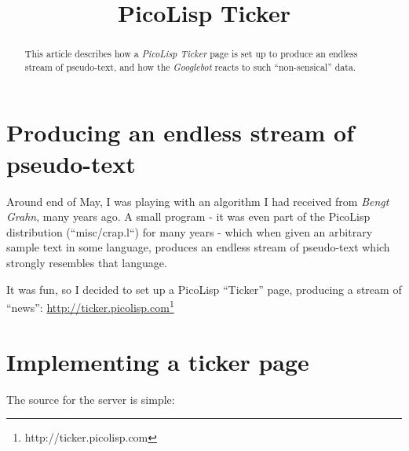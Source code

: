 \title{PicoLisp Ticker}

\maketitle





% 

\begin{abstract}
This article describes how a \emph{PicoLisp Ticker} page is set up to produce
an endless stream of pseudo-text, and how the \emph{Googlebot} reacts
to such ``non-sensical'' data.       
\end{abstract}

\section{Producing an endless stream of pseudo-text}
\label{sec:pl-ticker-producing-an-endless-stream-of-pseudo-text}

Around end of May, I was playing with an algorithm I had received from \emph{Bengt
Grahn}, many years ago. A small program - it was even part of the PicoLisp
distribution (``misc/crap.l``) for many years - which when given an arbitrary
sample text in some language, produces an endless stream of pseudo-text which
strongly resembles that language.

It was fun, so I decided to set up a PicoLisp ``Ticker'' page, producing a stream
of ``news'': \underline{http://ticker.picolisp.com}\footnote{http://ticker.picolisp.com}

\section{Implementing a ticker page}
\label{sec:pl-ticker-implementing-a-ticker-page}

The source for the server is simple:

